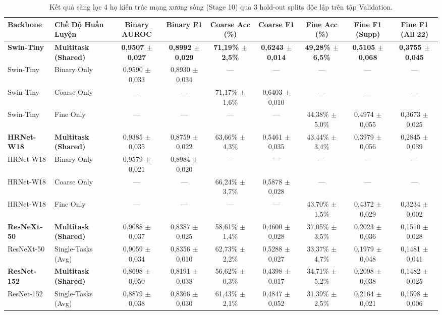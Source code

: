 \begin{table}[t]
\centering
\small
\caption{Kết quả sàng lọc 4 họ kiến trúc mạng xương sống (Stage 10) qua 3 hold-out splits độc lập trên tập Validation.}
\label{tab:backbone_screening}
\begin{adjustbox}{width=\textwidth}
\begin{tabular}{llccccccc}
\toprule
\textbf{Backbone} & \textbf{Chế Độ Huấn Luyện} & \textbf{Binary AUROC} & \textbf{Binary F1} & \textbf{Coarse Acc (\%)} & \textbf{Coarse F1} & \textbf{Fine Acc (\%)} & \textbf{Fine F1 (Supp)} & \textbf{Fine F1 (All 22)} \\
\midrule
\textbf{Swin-Tiny} & \textbf{Multitask (Shared)} & \textbf{0,9507 $\pm$ 0,027} & \textbf{0,8992 $\pm$ 0,029} & \textbf{71,19\% $\pm$ 2,5\%} & \textbf{0,6243 $\pm$ 0,014} & \textbf{49,28\% $\pm$ 6,5\%} & \textbf{0,5105 $\pm$ 0,068} & \textbf{0,3755 $\pm$ 0,045} \\
Swin-Tiny & Binary Only & 0,9590 $\pm$ 0,033 & 0,8930 $\pm$ 0,034 & --- & --- & --- & --- & --- \\
Swin-Tiny & Coarse Only & --- & --- & 71,17\% $\pm$ 1,6\% & 0,6403 $\pm$ 0,010 & --- & --- & --- \\
Swin-Tiny & Fine Only & --- & --- & --- & --- & 44,38\% $\pm$ 5,0\% & 0,4974 $\pm$ 0,055 & 0,3673 $\pm$ 0,025 \\
\midrule
\textbf{HRNet-W18} & \textbf{Multitask (Shared)} & 0,9385 $\pm$ 0,035 & 0,8759 $\pm$ 0,022 & 63,66\% $\pm$ 4,3\% & 0,5461 $\pm$ 0,035 & 43,44\% $\pm$ 3,4\% & 0,3979 $\pm$ 0,056 & 0,2845 $\pm$ 0,039 \\
HRNet-W18 & Binary Only & 0,9579 $\pm$ 0,021 & 0,8984 $\pm$ 0,020 & --- & --- & --- & --- & --- \\
HRNet-W18 & Coarse Only & --- & --- & 66,24\% $\pm$ 3,7\% & 0,5878 $\pm$ 0,028 & --- & --- & --- \\
HRNet-W18 & Fine Only & --- & --- & --- & --- & 43,70\% $\pm$ 1,5\% & 0,4372 $\pm$ 0,029 & 0,3234 $\pm$ 0,002 \\
\midrule
\textbf{ResNeXt-50} & \textbf{Multitask (Shared)} & 0,9088 $\pm$ 0,037 & 0,8387 $\pm$ 0,025 & 58,61\% $\pm$ 1,4\% & 0,4600 $\pm$ 0,028 & 37,05\% $\pm$ 3,5\% & 0,2023 $\pm$ 0,036 & 0,1510 $\pm$ 0,028 \\
ResNeXt-50 & Single-Tasks (Avg) & 0,9059 $\pm$ 0,034 & 0,8356 $\pm$ 0,010 & 62,73\% $\pm$ 2,2\% & 0,5288 $\pm$ 0,027 & 33,37\% $\pm$ 4,7\% & 0,1979 $\pm$ 0,048 & 0,1481 $\pm$ 0,041 \\
\midrule
\textbf{ResNet-152} & \textbf{Multitask (Shared)} & 0,8698 $\pm$ 0,050 & 0,8191 $\pm$ 0,038 & 56,62\% $\pm$ 0,3\% & 0,4398 $\pm$ 0,017 & 34,71\% $\pm$ 5,2\% & 0,2098 $\pm$ 0,038 & 0,1482 $\pm$ 0,025 \\
ResNet-152 & Single-Tasks (Avg) & 0,8879 $\pm$ 0,038 & 0,8366 $\pm$ 0,030 & 61,43\% $\pm$ 2,1\% & 0,4847 $\pm$ 0,052 & 31,39\% $\pm$ 2,5\% & 0,2164 $\pm$ 0,021 & 0,1598 $\pm$ 0,006 \\
\bottomrule
\end{tabular}
\end{adjustbox}
\end{table}
